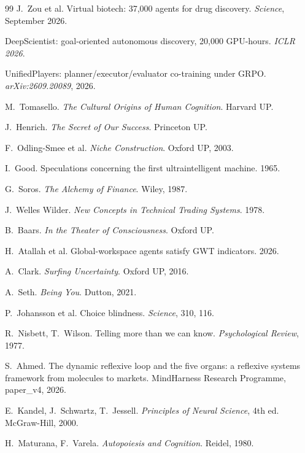 \documentclass[11pt]{article}
\begin{document}
\begin{thebibliography}{99}
 J.\ Zou et al. Virtual biotech: 37,000 agents for drug discovery. \textit{Science}, September 2026.

 DeepScientist: goal-oriented autonomous discovery, 20,000 GPU-hours. \textit{ICLR 2026}.

 UnifiedPlayers: planner/executor/evaluator co-training under GRPO. \textit{arXiv:2609.20089}, 2026.

 M.\ Tomasello. \textit{The Cultural Origins of Human Cognition}. Harvard UP.

 J.\ Henrich. \textit{The Secret of Our Success}. Princeton UP.

 F.\ Odling-Smee et al. \textit{Niche Construction}. Oxford UP, 2003.

 I.\ Good. Speculations concerning the first ultraintelligent machine. 1965.

 G.\ Soros. \textit{The Alchemy of Finance}. Wiley, 1987.

 J.\ Welles Wilder. \textit{New Concepts in Technical Trading Systems}. 1978.

 B.\ Baars. \textit{In the Theater of Consciousness}. Oxford UP.

 H.\ Atallah et al. Global-workspace agents satisfy GWT indicators. 2026.

 A.\ Clark. \textit{Surfing Uncertainty}. Oxford UP, 2016.

 A.\ Seth. \textit{Being You}. Dutton, 2021.

 P.\ Johansson et al. Choice blindness. \textit{Science}, 310, 116.

 R.\ Nisbett, T.\ Wilson. Telling more than we can know. \textit{Psychological Review}, 1977.

 S.\ Ahmed. The dynamic reflexive loop and the five organs: a reflexive systems framework from molecules to markets. MindHarness Research Programme, paper\_v4, 2026.

 E.\ Kandel, J.\ Schwartz, T.\ Jessell. \textit{Principles of Neural Science}, 4th ed. McGraw-Hill, 2000.

 H.\ Maturana, F.\ Varela. \textit{Autopoiesis and Cognition}. Reidel, 1980.

\end{thebibliography}
\end{document}
